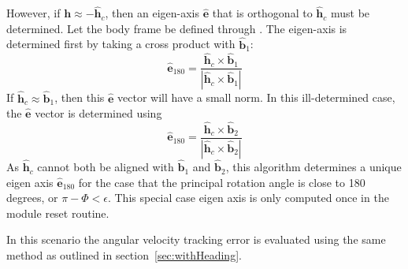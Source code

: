  
However, if $\bm h \approx -\hat{\bm h}_{c}$, then an eigen-axis $\hat{\bm e}$ that is orthogonal to $\hat{\bm h}_{c}$ must be determined.  Let the body frame be defined through .  The eigen-axis is determined first by taking a cross product with $\hat{\bm b}_{1}$:
 \begin{equation}
	\label{eq:ssp:7}
	\hat{\bm e}_{180} = \frac{ \hat{\bm h}_{c} \times \hat{\bm b}_{1}}{| \hat{\bm h}_{c} \times \hat{\bm b}_{1}|}
\end{equation}
If $\hat{\bm h}_{c} \approx \hat{\bm b}_{1}$, then this $\hat{\bm e}$ vector will have a small norm.  In this ill-determined case, the $\hat{\bm e}$ vector is determined using
 \begin{equation}
	\label{eq:ssp:8}
	\hat{\bm e}_{180} = \frac{ \hat{\bm h}_{c} \times \hat{\bm b}_{2}}{| \hat{\bm h}_{c} \times \hat{\bm b}_{2}|}
\end{equation}
As $ \hat{\bm h}_{c}$ cannot both be aligned with $\hat{\bm b}_{1}$ and $\hat{\bm b}_{2}$, this algorithm determines a unique eigen axis $\hat{\bm e}_{180}$ for the case that the principal rotation angle is close to 180 degrees, or $\pi - \Phi < \epsilon$.  This special case eigen axis is only computed once in the module reset routine.

In this scenario the angular velocity tracking error is evaluated using the same method as outlined in section~\ref{sec:withHeading}.
 
 
